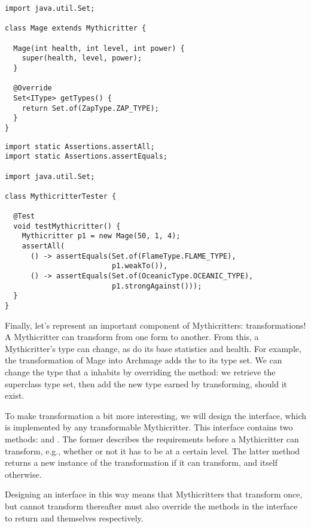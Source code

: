 \begin{lstlisting}[language=MyJava]
import java.util.Set;

class Mage extends Mythicritter {

  Mage(int health, int level, int power) {
    super(health, level, power);
  }

  @Override
  Set<IType> getTypes() {
    return Set.of(ZapType.ZAP_TYPE);
  }
}
\end{lstlisting}

\begin{lstlisting}[language=MyJava]
import static Assertions.assertAll;
import static Assertions.assertEquals;

import java.util.Set;

class MythicritterTester {

  @Test
  void testMythicritter() {
    Mythicritter p1 = new Mage(50, 1, 4);
    assertAll(
      () -> assertEquals(Set.of(FlameType.FLAME_TYPE),
                         p1.weakTo()),
      () -> assertEquals(Set.of(OceanicType.OCEANIC_TYPE),
                         p1.strongAgainst()));
  }
}
\end{lstlisting}

Finally, let's represent an important component of Mythicritters: transformations! A Mythicritter can transform from one form to another. 
From this, a Mythicritter's type can change, as do its base statistics and health. 
For example, the transformation of Mage into Archmage adds the  to its type set. 
We can change the type that a  inhabits by overriding the  method: we retrieve the superclass type set, then add the new type earned by transforming, should it exist.

To make transformation a bit more interesting, we will design the  interface, which is implemented by any transformable Mythicritter. 
This interface contains two methods:  and . 
The former describes the requirements before a Mythicritter can transform, e.g., whether or not it has to be at a certain level. 
The latter  method returns a new instance of the transformation if it can transform, and itself otherwise. 

Designing an interface in this way means that Mythicritters that transform once, but cannot transform thereafter must also override the methods in the  interface to return  and themselves respectively.

